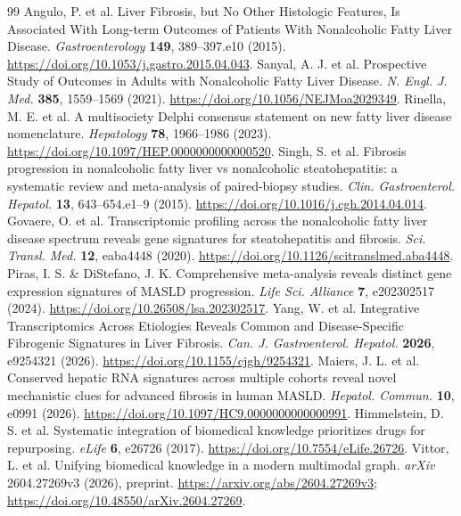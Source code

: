 \documentclass[11pt,a4paper]{article}
\begin{document}
\begin{thebibliography}{99}
 Angulo, P. et al. Liver Fibrosis, but No Other Histologic Features, Is Associated With Long-term Outcomes of Patients With Nonalcoholic Fatty Liver Disease. \textit{Gastroenterology} \textbf{149}, 389–397.e10 (2015). \url{https://doi.org/10.1053/j.gastro.2015.04.043}.
 Sanyal, A. J. et al. Prospective Study of Outcomes in Adults with Nonalcoholic Fatty Liver Disease. \textit{N. Engl. J. Med.} \textbf{385}, 1559–1569 (2021). \url{https://doi.org/10.1056/NEJMoa2029349}.
 Rinella, M. E. et al. A multisociety Delphi consensus statement on new fatty liver disease nomenclature. \textit{Hepatology} \textbf{78}, 1966–1986 (2023). \url{https://doi.org/10.1097/HEP.0000000000000520}.
 Singh, S. et al. Fibrosis progression in nonalcoholic fatty liver vs nonalcoholic steatohepatitis: a systematic review and meta-analysis of paired-biopsy studies. \textit{Clin. Gastroenterol. Hepatol.} \textbf{13}, 643--654.e1--9 (2015). \url{https://doi.org/10.1016/j.cgh.2014.04.014}.
 Govaere, O. et al. Transcriptomic profiling across the nonalcoholic fatty liver disease spectrum reveals gene signatures for steatohepatitis and fibrosis. \textit{Sci. Transl. Med.} \textbf{12}, eaba4448 (2020). \url{https://doi.org/10.1126/scitranslmed.aba4448}.
 Piras, I. S. \& DiStefano, J. K. Comprehensive meta-analysis reveals distinct gene expression signatures of MASLD progression. \textit{Life Sci. Alliance} \textbf{7}, e202302517 (2024). \url{https://doi.org/10.26508/lsa.202302517}.
 Yang, W. et al. Integrative Transcriptomics Across Etiologies Reveals Common and Disease-Specific Fibrogenic Signatures in Liver Fibrosis. \textit{Can. J. Gastroenterol. Hepatol.} \textbf{2026}, e9254321 (2026). \url{https://doi.org/10.1155/cjgh/9254321}.
 Maiers, J. L. et al. Conserved hepatic RNA signatures across multiple cohorts reveal novel mechanistic clues for advanced fibrosis in human MASLD. \textit{Hepatol. Commun.} \textbf{10}, e0991 (2026). \url{https://doi.org/10.1097/HC9.0000000000000991}.
 Himmelstein, D. S. et al. Systematic integration of biomedical knowledge prioritizes drugs for repurposing. \textit{eLife} \textbf{6}, e26726 (2017). \url{https://doi.org/10.7554/eLife.26726}.
 Vittor, L. et al. Unifying biomedical knowledge in a modern multimodal graph. \textit{arXiv} 2604.27269v3 (2026), preprint. \url{https://arxiv.org/abs/2604.27269v3}; \url{https://doi.org/10.48550/arXiv.2604.27269}.

\end{thebibliography}
\end{document}
